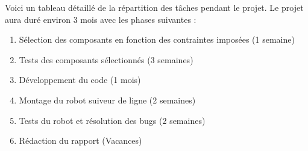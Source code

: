 Voici un tableau détaillé de la répartition des tâches pendant le projet.
Le projet aura duré environ 3 mois avec les phases suivantes :
\begin{enumerate}
    \item Sélection des composants en fonction des contraintes imposées (1 semaine)
    \item Tests des composants sélectionnés (3 semaines)
    \item Développement du code (1 mois)
    \item Montage du robot suiveur de ligne (2 semaines)
    \item Tests du robot et résolution des bugs (2 semaines)
    \item Rédaction du rapport (Vacances)
\end{enumerate}

\newpage
